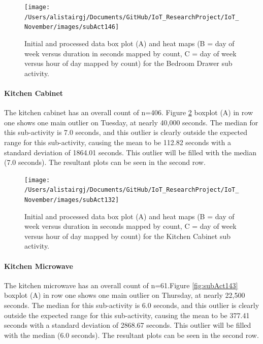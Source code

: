 \documentclass[11pt,]{article}
\let\oldparagraph\paragraph
\renewcommand{\paragraph}[1]{\oldparagraph{#1}\mbox{}}
\begin{document}
\begin{figure}[H]

{\centering \texttt{[image: /Users/alistairgj/Documents/GitHub/IoT\_ResearchProject/IoT\_November/images/subAct146]} 

}

\caption{Initial and processed data box plot (A) and heat maps (B = day of week versus duration in seconds mapped by count, C = day of week versus hour of day mapped by count) for the Bedroom Drawer sub activity.}\label{fig:subAct146}
\end{figure}

\hypertarget{kitchen-cabinet}{%
\paragraph{Kitchen Cabinet}\label{kitchen-cabinet}}

The kitchen cabinet has an overall count of n=406. Figure
\ref{fig:subAct132} boxplot (A) in row one shows one main outlier on
Tuesday, at nearly 40,000 seconds. The median for this sub-activity is
7.0 seconds, and this outlier is clearly outside the expected range for
this sub-activity, causing the mean to be 112.82 seconds with a standard
deviation of 1864.01 seconds. This outlier will be filled with the
median (7.0 seconds). The resultant plots can be seen in the second row.

\begin{figure}[H]

{\centering \texttt{[image: /Users/alistairgj/Documents/GitHub/IoT\_ResearchProject/IoT\_November/images/subAct132]} 

}

\caption{Initial and processed data box plot (A) and heat maps (B = day of week versus duration in seconds mapped by count, C = day of week versus hour of day mapped by count) for the Kitchen Cabinet sub activity.}\label{fig:subAct132}
\end{figure}

\hypertarget{kitchen-microwave}{%
\paragraph{Kitchen Microwave}\label{kitchen-microwave}}

The kitchen microwave has an overall count of n=61.Figure
\ref{fig:subAct143} boxplot (A) in row one shows one main outlier on
Thursday, at nearly 22,500 seconds. The median for this sub-activity is
6.0 seconds, and this outlier is clearly outside the expected range for
this sub-activity, causing the mean to be 377.41 seconds with a standard
deviation of 2868.67 seconds. This outlier will be filled with the
median (6.0 seconds). The resultant plots can be seen in the second row.
\end{document}
